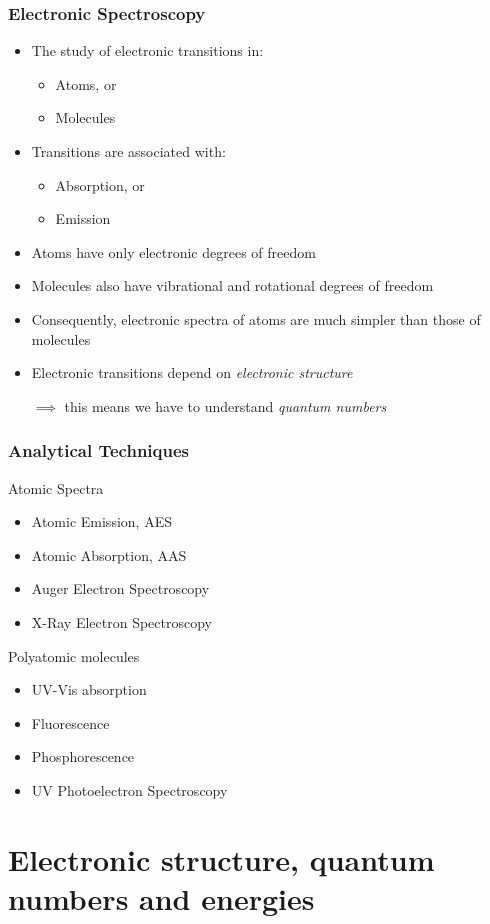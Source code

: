 \documentclass[a4paper,titlepage]{article}
\begin{document}
\begin{frame}[<+->]
\frametitle{Electronic Spectroscopy}
\begin{itemize}
\item The study of electronic transitions in:
\begin{itemize}
\item Atoms, or
\item Molecules
\end{itemize}
\item Transitions are associated with:
\begin{itemize}
\item Absorption, or
\item Emission
\end{itemize}
\item Atoms have only electronic degrees of freedom
\item Molecules also have vibrational and rotational degrees of freedom
\item Consequently, electronic spectra of atoms are much simpler than those of molecules
\item Electronic transitions depend on \emph{electronic structure}
\item[\(\implies\)] this means we have to understand \emph{quantum numbers}
\end{itemize}
\end{frame}

\begin{frame}
\frametitle{Analytical Techniques}

Atomic Spectra
\begin{itemize}
\item Atomic Emission, AES
\item Atomic Absorption, AAS
\item Auger Electron Spectroscopy
\item X-Ray Electron Spectroscopy
\end{itemize}
Polyatomic molecules
\begin{itemize}
\item UV-Vis absorption
\item Fluorescence
\item Phosphorescence
\item UV Photoelectron Spectroscopy
\end{itemize}
\end{frame}

\section{Electronic structure, quantum numbers and energies}
\end{document}
